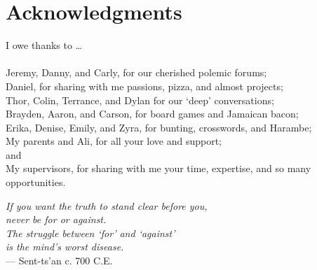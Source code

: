 \section*{Acknowledgments}
I owe thanks to \dots\\
\\Jeremy, Danny, and Carly, for our cherished polemic forums;
\\Daniel, for sharing with me passions, pizza, and almost projects;
\\Thor, Colin, Terrance, and Dylan for our `deep' conversations;
\\Brayden, Aaron, and Carson, for board games and Jamaican bacon;
\\Erika, Denise, Emily, and Zyra, for bunting, crosswords, and Harambe;
\\My parents and Ali, for all your love and support;
\\and
\\My supervisors, for sharing with me your time, expertise, and so many opportunities.
\vfill
\begin{singlespace}
  \hspace*{4.0cm}\textit{If you want the truth to stand clear before you,}\\
  \hspace*{4.5cm}\textit{never be for or against.}                        \\
  \hspace*{4.0cm}\textit{The struggle between `for' and `against'}        \\
  \hspace*{4.5cm}\textit{is the mind's worst disease.}                    \\[0.5em]
  \hspace*{9.0cm}\normalfont --- Sent-ts'an c. 700 C.E.
\end{singlespace}
